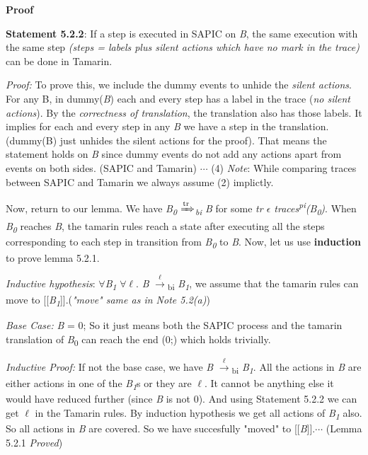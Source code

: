 \documentclass[11pt]{article}
\begin{document}
{\bf Proof }\newline

{\bf Statement 5.2.2}: If a step is executed in SAPIC on {\it B}, the same execution with the same step {\it(steps = labels plus silent actions which have no mark in the trace)} can be done in Tamarin. \newline

{\it Proof:} To prove this, we include the dummy events to unhide the {\it silent actions}. For any B, in dummy({\it B}) each and every step has a label in the trace ({\it no silent actions}). By the {\it correctness of translation}, the translation also has those labels. It implies for each and every step in any {\it B} we have a step in the translation. (dummy(B) just unhides the silent actions for the proof). That means the statement holds on {\it B} since dummy events do not add any actions apart from events on both sides. (SAPIC and Tamarin) \hfill \hfill $\cdots$ (4) \newline
{\it Note}: While comparing traces between SAPIC and Tamarin we always assume (2) implictly.\newline

Now, return to our lemma. We have {\it B\textsubscript{0} {$\xRightarrow[\text{}]{\text{tr}}$}\textsubscript{bi} B} for some {\it tr $\epsilon$ traces\textsuperscript{pi}(B\textsubscript{0})}. When {\it B\textsubscript{0}} reaches {\it B}, the tamarin rules reach a state after executing all the steps corresponding to each step in transition from {\it B\textsubscript{0}} to {\it B}. Now, let us use {\bf induction} to prove lemma 5.2.1.

{\it Inductive hypothesis}: $\forall${\it B\textsubscript{1}} $\forall$$\ell$. {\it B} {$\xrightarrow[\text{}]{\text{$\ell$}}$}{\textsubscript{bi}} {\it B\textsubscript{1}}, we assume that the tamarin rules can move to [[{\it B\textsubscript{1}}]].\hfill \hfill ({\it "move" same as in Note 5.2(a)}) 

{\it Base Case: }{\it B} = 0; So it just means both the SAPIC process and the tamarin translation of {\it B}\textsubscript{0} can reach the end (0;) which holds trivially.

{\it Inductive Proof: }If not the base case, we have {\it B} {$\xrightarrow[\text{}]{\text{$\ell$}}$}{\textsubscript{bi}} {\it B\textsubscript{1}}. All the actions in {\it B} are either actions in one of the {\it B\textsubscript{1}}s or they are $\ell$. It cannot be anything else it would have reduced further (since {\it B} is not 0). And using Statement 5.2.2 we can get $\ell$ in the Tamarin rules. By induction hypothesis we get all actions of {\it B\textsubscript{1}} also. So all actions in {\it B} are covered. So we have succesfully "moved" to [[{\it B}]].\hfill \hfill $\cdots$ (Lemma 5.2.1 {\it Proved})\newline
\end{document}
